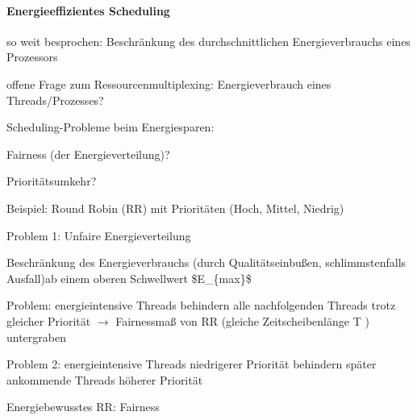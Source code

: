 \documentclass[a4paper]{article}
\begin{document}
\begin{multicols}{3}
    \paragraph{Energieeffizientes Scheduling}
    \begin{itemize*}
        \item so weit besprochen: Beschränkung des durchschnittlichen Energieverbrauchs eines Prozessors
        \item offene Frage zum Ressourcenmultiplexing: Energieverbrauch eines Threads/Prozesses?
        \item Scheduling-Probleme beim Energiesparen:
        \begin{enumerate*}
            \item Fairness (der Energieverteilung)?
            \item Prioritätsumkehr?
        \end{enumerate*}
        \item Beispiel: Round Robin (RR) mit Prioritäten (Hoch, Mittel, Niedrig)
        \item Problem 1: Unfaire Energieverteilung
        \begin{itemize*}
            \item Beschränkung des Energieverbrauchs (durch Qualitätseinbußen, schlimmstenfalls Ausfall)ab einem oberen Schwellwert \$E\_\{max\}\$
            \item Problem: energieintensive Threads behindern alle nachfolgenden Threads trotz gleicher Priorität $\rightarrow$ Fairnessmaß von RR (gleiche Zeitscheibenlänge T ) untergraben
            \item %
            \item Problem 2: energieintensive Threads niedrigerer Priorität behindern
            später ankommende Threads höherer Priorität
        \end{itemize*}
    \end{itemize*}

    Energiebewusstes RR: Fairness


\end{multicols}
\end{document}
